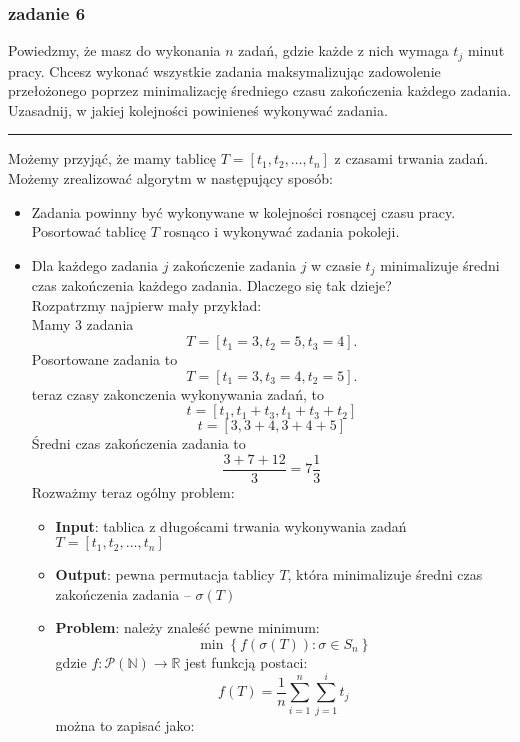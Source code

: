 \documentclass[11pt,a4paper]{article}
\begin{document}
\subsubsection{zadanie 6}
Powiedzmy, że masz do wykonania $n$ zadań, gdzie każde z nich wymaga $t_j$ minut pracy. Chcesz wykonać wszystkie zadania maksymalizując zadowolenie przełożonego poprzez minimalizację średniego czasu zakończenia każdego zadania. Uzasadnij, w jakiej kolejności powinieneś wykonywać zadania.

\bigskip
\hrule
\bigskip

Możemy przyjąć, że mamy tablicę $T=[t_1, t_2, \ldots, t_n]$ z czasami trwania zadań. Możemy zrealizować algorytm w następujący sposób:
\begin{itemize}
    \item Zadania powinny być wykonywane w kolejności rosnącej czasu pracy. Posortować tablicę $T$ rosnąco i wykonywać zadania pokoleji.
    \item Dla każdego zadania $j$ zakończenie zadania $j$ w czasie $t_j$ minimalizuje średni czas zakończenia każdego zadania. Dlaczego się tak dzieje?\\
        Rozpatrzmy najpierw mały przykład: \\
        Mamy 3 zadania
        \[
            T= [t_1=3, t_2=5, t_3=4].
        \]
        Posortowane zadania to
        \[
            T= [t_1=3, t_3=4, t_2=5].
        \]
        teraz czasy zakonczenia wykonywania zadań, to
        \[
            t= [t_1, t_1+t_3, t_1+t_3+t_2]
        \]
        \[
            t=[3, 3+4, 3+4+5]
        \]
        Średni czas zakończenia zadania to
        \[
            \frac{3+7+12}{3}=7\frac{1}{3}
        \]
        Rozważmy teraz ogólny problem:
        \begin{itemize}
            \item \textbf{Input}: tablica z długoścami trwania wykonywania zadań $T=[t_1, t_2, \dots, t_n]$
            \item \textbf{Output}: pewna permutacja tablicy $T$, która minimalizuje średni czas zakończenia zadania -- $\sigma(T)$
            \item \textbf{Problem}: należy znaleść pewne minimum:
                \[
                    \min \left\{ f(\sigma(T)): \sigma \in S_n \right\}
                \]
                gdzie $f: \mathcal{P}\left(\mathbb{N}\right) \rightarrow \mathbb{R}$ jest funkcją postaci:
            \[
                f(T) = \frac{1}{n} \sum_{i=1}^{n} \sum_{j=1}^{i} t_j
            \]
            można to zapisać jako:

\end{itemize}
\end{itemize}
\end{document}
